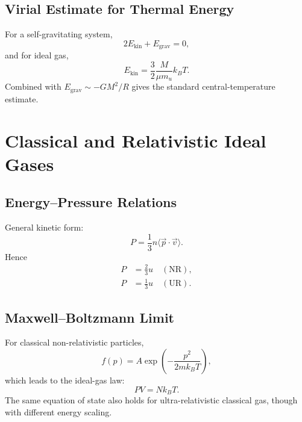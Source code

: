 \subsection{Virial Estimate for Thermal Energy}
\begin{theory}
For a self-gravitating system,
\begin{equation}
    2E_{\text{kin}}+E_{\text{grav}}=0,
\end{equation}
and for ideal gas,
\begin{equation}
    E_{\text{kin}}=\frac{3}{2}\frac{M}{\mu m_u}k_B T.
\end{equation}
Combined with $E_{\text{grav}}\sim -GM^2/R$ gives the standard central-temperature estimate.
\end{theory}

\section{Classical and Relativistic Ideal Gases}

\subsection{Energy--Pressure Relations}
\begin{theory}
General kinetic form:
\begin{equation}
    P=\frac{1}{3}n\langle\vec p\cdot\vec v\rangle.
\end{equation}
Hence
\begin{align}
    P &= \frac{2}{3}u \quad (\text{NR}), \\
    P &= \frac{1}{3}u \quad (\text{UR}).
\end{align}
\end{theory}

\subsection{Maxwell--Boltzmann Limit}
\begin{theory}
For classical non-relativistic particles,
\begin{equation}
    f(p)=A\exp\left(-\frac{p^2}{2mk_B T}\right),
\end{equation}
which leads to the ideal-gas law:
\begin{equation}
    PV=Nk_B T.
\end{equation}
The same equation of state also holds for ultra-relativistic classical gas, though with different energy scaling.
\end{theory}

